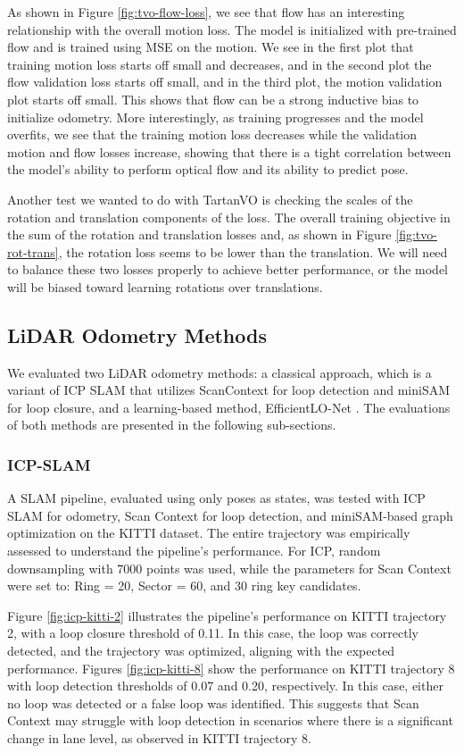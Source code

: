 \documentclass[11pt,a4paper]{article}
\begin{document}
As shown in Figure \ref{fig:tvo-flow-loss}, we see that flow has an interesting relationship with the overall motion loss. The model is initialized with pre-trained flow and is trained using MSE on the motion. We see in the first plot that training motion loss starts off small and decreases, and in the second plot the flow validation loss starts off small, and in the third plot, the motion validation plot starts off small. This shows that flow can be a strong inductive bias to initialize odometry. More interestingly, as training progresses and the model overfits, we see that the training motion loss decreases while the validation motion and flow losses increase, showing that there is a tight correlation between the model's ability to perform optical flow and its ability to predict pose.

Another test we wanted to do with TartanVO is checking the scales of the rotation and translation components of the loss. The overall training objective in the sum of the rotation and translation losses and, as shown in Figure \ref{fig:tvo-rot-trans}, the rotation loss seems to be lower than the translation. We will need to balance these two losses properly to achieve better performance, or the model will be biased toward learning rotations over translations.

\subsection{LiDAR Odometry Methods}
We evaluated two LiDAR odometry methods: a classical approach, which is a variant of ICP SLAM that utilizes ScanContext for loop detection and miniSAM for loop closure, and a learning-based method, EfficientLO-Net \cite{eff-lo-net}. The evaluations of both methods are presented in the following sub-sections. 

\subsubsection{ICP-SLAM}
A SLAM pipeline, evaluated using only poses as states, was tested with ICP SLAM for odometry, Scan Context for loop detection, and miniSAM-based graph optimization on the KITTI dataset. The entire trajectory was empirically assessed to understand the pipeline's performance. For ICP, random downsampling with 7000 points was used, while the parameters for Scan Context were set to: Ring = 20, Sector = 60, and 30 ring key candidates. 

Figure \ref{fig:icp-kitti-2} illustrates the pipeline's performance on KITTI trajectory 2, with a loop closure threshold of 0.11. In this case, the loop was correctly detected, and the trajectory was optimized, aligning with the expected performance. Figures \ref{fig:icp-kitti-8} show the performance on KITTI trajectory 8 with loop detection thresholds of 0.07 and 0.20, respectively. In this case, either no loop was detected or a false loop was identified. This suggests that Scan Context may struggle with loop detection in scenarios where there is a significant change in lane level, as observed in KITTI trajectory 8.
\end{document}
